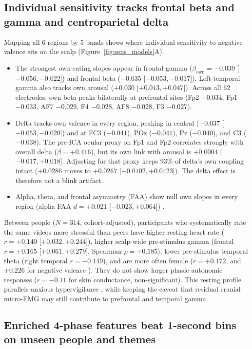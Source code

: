 \documentclass[10pt]{article}
\begin{document}
\subsection{Individual sensitivity tracks frontal beta and gamma and centroparietal delta}

Mapping all 6 regions by 5 bands shows where individual sensitivity to negative valence sits on the scalp (Figure~\ref{fig:sens_models}A).
\begin{itemize}
\item The strongest own-rating slopes appear in frontal gamma ($\beta_{\text{own}} = -0.039$ [$-0.056, -0.022$]) and frontal beta ($-0.035$ [$-0.053, -0.017$]). Left-temporal gamma also tracks own arousal ($+0.030$ [$+0.013, +0.047$]). Across all 62 electrodes, own beta peaks bilaterally at prefrontal sites (Fp2 $-0.034$, Fp1 $-0.033$, AF7 $-0.029$, F4 $-0.028$, AF8 $-0.028$, F3 $-0.027$).
\item Delta tracks own valence in every region, peaking in central ($-0.037$ [$-0.053, -0.020$]) and at FC3 ($-0.041$), POz ($-0.041$), Pz ($-0.040$), and C3 ($-0.038$). The pre-ICA ocular proxy on Fp1 and Fp2 correlates strongly with overall delta ($\beta = +0.416$), but its own link with arousal is $+0.0004$ [$-0.017, +0.018$]. Adjusting for that proxy keeps 93\% of delta's own coupling intact ($+0.0286$ moves to $+0.0267$ [$+0.0102, +0.0423$]). The delta effect is therefore not a blink artifact.
\item Alpha, theta, and frontal asymmetry (FAA) show null own slopes in every region (alpha FAA $d = +0.021$ [$-0.023, +0.064$]) \cite{vandervinne2017}.
\end{itemize}

Between people ($N = 314$, cohort-adjusted), participants who systematically rate the same videos more stressful than peers have higher resting heart rate ($r = +0.140$ [$+0.032, +0.244$]), higher scalp-wide pre-stimulus gamma (frontal $r = +0.165$ [$+0.061, +0.279$], Spearman $\rho = +0.185$), lower pre-stimulus temporal theta (right temporal $r = -0.149$), and are more often female ($r = +0.172$, and $+0.226$ for negative valence \cite{bradley2001}). They do not show larger phasic autonomic responses ($r = -0.11$ for skin conductance, non-significant). This resting profile parallels anxious hypervigilance \cite{oathes2008}, while keeping the caveat that residual cranial micro-EMG may still contribute to prefrontal and temporal gamma.

\subsection{Enriched 4-phase features beat 1-second bins on unseen people and themes}
\end{document}
